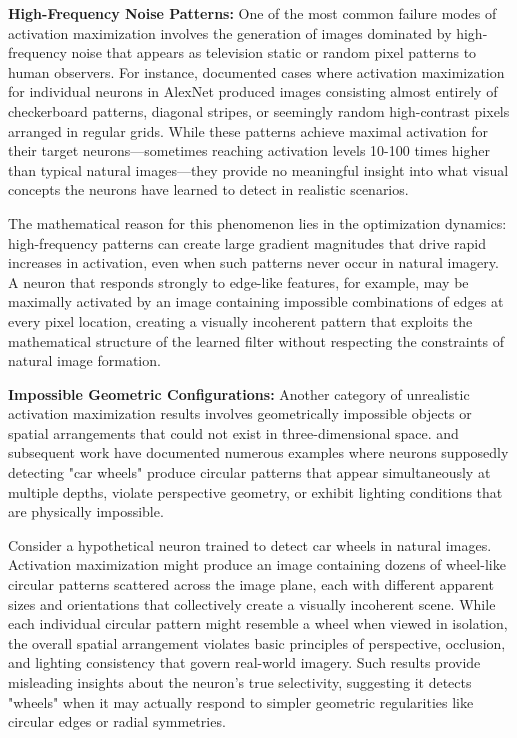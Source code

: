 \documentclass[licencjacka,en]{pracamgr}
\begin{document}
\textbf{High-Frequency Noise Patterns:} One of the most common failure modes of activation maximization involves the generation of images dominated by high-frequency noise that appears as television static or random pixel patterns to human observers. For instance, \citet{olah2017feature} documented cases where activation maximization for individual neurons in AlexNet produced images consisting almost entirely of checkerboard patterns, diagonal stripes, or seemingly random high-contrast pixels arranged in regular grids. While these patterns achieve maximal activation for their target neurons—sometimes reaching activation levels 10-100 times higher than typical natural images—they provide no meaningful insight into what visual concepts the neurons have learned to detect in realistic scenarios.

The mathematical reason for this phenomenon lies in the optimization dynamics: high-frequency patterns can create large gradient magnitudes that drive rapid increases in activation, even when such patterns never occur in natural imagery. A neuron that responds strongly to edge-like features, for example, may be maximally activated by an image containing impossible combinations of edges at every pixel location, creating a visually incoherent pattern that exploits the mathematical structure of the learned filter without respecting the constraints of natural image formation.

\textbf{Impossible Geometric Configurations:} Another category of unrealistic activation maximization results involves geometrically impossible objects or spatial arrangements that could not exist in three-dimensional space. \citet{szegedy2014goingdeeperconvolutions} and subsequent work have documented numerous examples where neurons supposedly detecting "car wheels" produce circular patterns that appear simultaneously at multiple depths, violate perspective geometry, or exhibit lighting conditions that are physically impossible.

Consider a hypothetical neuron trained to detect car wheels in natural images. Activation maximization might produce an image containing dozens of wheel-like circular patterns scattered across the image plane, each with different apparent sizes and orientations that collectively create a visually incoherent scene. While each individual circular pattern might resemble a wheel when viewed in isolation, the overall spatial arrangement violates basic principles of perspective, occlusion, and lighting consistency that govern real-world imagery. Such results provide misleading insights about the neuron's true selectivity, suggesting it detects "wheels" when it may actually respond to simpler geometric regularities like circular edges or radial symmetries.
\end{document}

